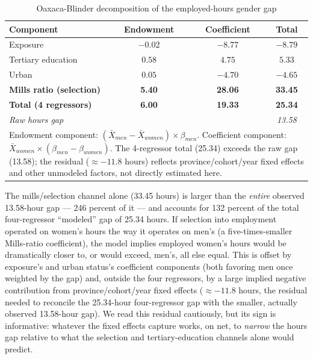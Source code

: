\documentclass[11pt]{article}
\begin{document}
\begin{table}[htbp]
\centering
\caption{Oaxaca-Blinder decomposition of the employed-hours gender gap}
\label{tab:oaxaca}
\begin{tabular}{lccc}
\toprule
Component & Endowment & Coefficient & Total \\
\midrule
Exposure                        & $-0.02$ & $-8.77$ & $-8.79$ \\
Tertiary education              & $0.58$  & $4.75$  & $5.33$  \\
Urban                           & $0.05$  & $-4.70$ & $-4.65$ \\
\textbf{Mills ratio (selection)} & \textbf{5.40}  & \textbf{28.06} & \textbf{33.45} \\
\midrule
\textbf{Total (4 regressors)}    & \textbf{6.00}  & \textbf{19.33} & \textbf{25.34} \\
\emph{Raw hours gap}            &         &         & \emph{13.58}   \\
\bottomrule
\multicolumn{4}{p{0.85\textwidth}}{\footnotesize Endowment component: $(\bar{X}_{men}-\bar{X}_{women})\times\beta_{men}$. Coefficient component: $\bar{X}_{women}\times(\beta_{men}-\beta_{women})$. The 4-regressor total (25.34) exceeds the raw gap (13.58); the residual ($\approx-11.8$ hours) reflects province/cohort/year fixed effects and other unmodeled factors, not directly estimated here.}
\end{tabular}
\end{table}

The mills/selection channel alone (33.45 hours) is larger than the \emph{entire} observed 13.58-hour gap --- 246 percent of it --- and accounts for 132 percent of the total four-regressor ``modeled'' gap of 25.34 hours. If selection into employment operated on women's hours the way it operates on men's (a five-times-smaller Mills-ratio coefficient), the model implies employed women's hours would be dramatically closer to, or would exceed, men's, all else equal. This is offset by exposure's and urban status's coefficient components (both favoring men once weighted by the gap) and, outside the four regressors, by a large implied negative contribution from province/cohort/year fixed effects ($\approx-11.8$ hours, the residual needed to reconcile the 25.34-hour four-regressor gap with the smaller, actually observed 13.58-hour gap). We read this residual cautiously, but its sign is informative: whatever the fixed effects capture works, on net, to \emph{narrow} the hours gap relative to what the selection and tertiary-education channels alone would predict.
\end{document}

